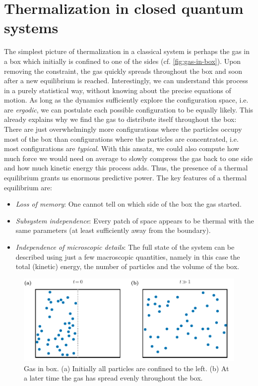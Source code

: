 \section{Thermalization in closed quantum systems}
\label{sec:Thermalization-in-closed-QS}
The simplest picture of thermalization in a classical system is perhaps the gas in a box which initially is confined to one of the sides (cf. \autoref{fig:gas-in-box}). Upon removing the constraint, the gas quickly spreads throughout the box and soon after a new equilibrium is reached. Interestingly, we can understand this process in a purely statistical way, without knowing about the precise equations of motion. As long as the dynamics sufficiently explore the configuration space, i.e. are \emph{ergodic}, we can postulate each possible configuration to be equally likely. This already explains why we find the gas to distribute itself throughout the box: There are just overwhelmingly more configurations where the particles occupy most of the box than configurations where the particles are concentrated, i.e. most configurations are \emph{typical}. With this ansatz, we could also compute how much force we would need on average to slowly compress the gas back to one side and how much kinetic energy this process adds. Thus, the presence of a thermal equilibrium grants us enormous predictive power.
The key features of a thermal equilibrium are:
\begin{itemize}
	\item \emph{Loss of memory}: One cannot tell on which side of the box the gas started.
	\item \emph{Subsystem independence}: Every patch of space appears to be thermal with the same parameters (at least sufficiently away from the boundary).
	\item \emph{Independence of microscopic details}: The full state of the system can be described using just a few macroscopic quantities, namely in this case the total (kinetic) energy, the number of particles and the volume of the box.
\end{itemize}

\begin{figure}[htb]
	\centering
	\includegraphics[]{gfx/part1/gas-in-box}
	\caption{Gas in box. (a) Initially all particles are confined to the left. (b) At a later time the gas has spread evenly throughout the box.}
	\label{fig:gas-in-box}
\end{figure}

